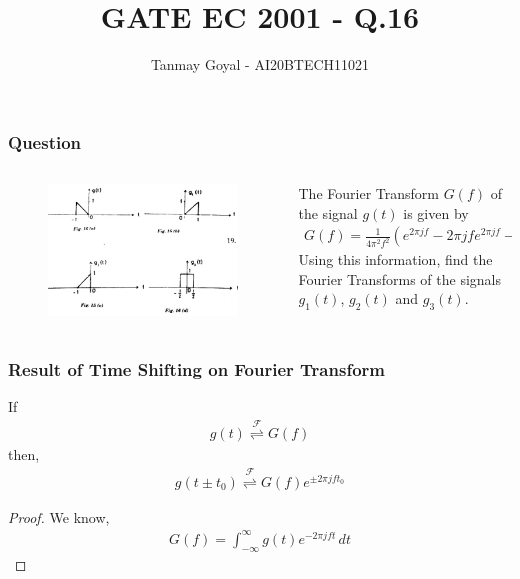 \documentclass{beamer}
\title{GATE EC 2001 - Q.16}
\author{Tanmay Goyal - AI20BTECH11021}
\date{}
\providecommand{\fourier}{\overset{\mathcal{F}}{ \rightleftharpoons}}
\begin{document}
\begin{frame}
\titlepage
\end{frame}
\begin{frame}
\frametitle{Question}
\begin{flushleft} 
\begin{columns}
\begin{column}{0.5\textwidth}
\begin{figure}[!ht]
\centering
 \includegraphics[width=\columnwidth]{Question.png}
\end{figure}
\end{column}
\begin{column}{0.5\textwidth}
The Fourier Transform $G(f)$ of the signal $g(t)$ is given by 
\begin{align}
    G(f) = \frac{1}{4\pi^2 f^2}(e^{2\pi jf} - 2\pi jf e^{2\pi jf} -1)
\end{align}
Using this information, find the Fourier Transforms of the signals $g_1(t)$, $g_2(t)$ and $g_3(t)$.
\end{column}
\end{columns}

 
\end{flushleft}
\end{frame}

\begin{frame}[fragile]
\frametitle{Result of Time Shifting on Fourier Transform}

\begin{flushleft}
\begin{lemma}
If 
\begin{align}
    g(t) \fourier G(f)
\end{align}
then,
\begin{align}
    g(t \pm t_0) \fourier G(f)e^{\pm 2\pi j f t_0}
\end{align}
\label{shift}
\end{lemma} 
\begin{proof}
We know, 
\begin{align}
    G(f) = \int_{-\infty}^\infty g(t) e^{-2\pi j ft} \,dt
\end{align}
\end{proof}
\end{flushleft}
\end{frame}
\end{document}
